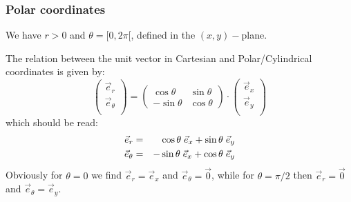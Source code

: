 \subsubsection{Polar coordinates}

We have $r>0$ and $\theta=[0,2\pi[$, defined in the $(x,y)-$plane.



\noindent The relation between the unit vector in Cartesian and Polar/Cylindrical coordinates
is given by:
\[
\left(
\begin{array}{c}
{\vec e}_{r} \\
{\vec e}_{\theta} \\
\end{array}
\right)
=
\left(
\begin{array}{cc}
\cos \theta & \sin \theta \\
-\sin \theta & \cos \theta
\end{array}
\right)
\cdot
\left(
\begin{array}{c}
{\vec e}_{x} \\
{\vec e}_{y} \\
\end{array}
\right)
\]
which should be read:
\begin{eqnarray}
{\vec e}_{r}      &=& \cos\theta \; {\vec e}_{x} + \sin\theta \;  {\vec e}_{y} \nonumber\\
{\vec e}_{\theta} &=& -\sin\theta \; {\vec e}_{x} + \cos\theta \;  {\vec e}_{y} 
\end{eqnarray}
Obviously for $\theta=0$ we find $\vec{e}_r=\vec{e}_x$ and $\vec{e}_\theta = \vec{0}$, while for 
$\theta=\pi/2$ then $\vec{e}_r=\vec{0}$ and $\vec{e}_\theta=\vec{e}_y$.

